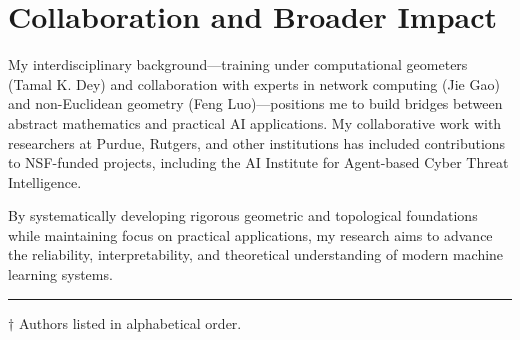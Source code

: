 \documentclass[11pt,letterpaper]{article}
\begin{document}
\vspace{-0.1in}
\section*{Collaboration and Broader Impact}
\vspace{-0.1in}

My interdisciplinary background—training under computational geometers (Tamal K. Dey) and collaboration with experts in network computing (Jie Gao) and non-Euclidean geometry (Feng Luo)—positions me to build bridges between abstract mathematics and practical AI applications. My collaborative work with researchers at Purdue, Rutgers, and other institutions has included contributions to NSF-funded projects, including the AI Institute for Agent-based Cyber Threat Intelligence.

By systematically developing rigorous geometric and topological foundations while maintaining focus on practical applications, my research aims to advance the reliability, interpretability, and theoretical understanding of modern machine learning systems.




\vspace{0.5cm}
\noindent\rule{\textwidth}{0.4pt}
\noindent $\dagger$ Authors listed in alphabetical order.
\end{document}
